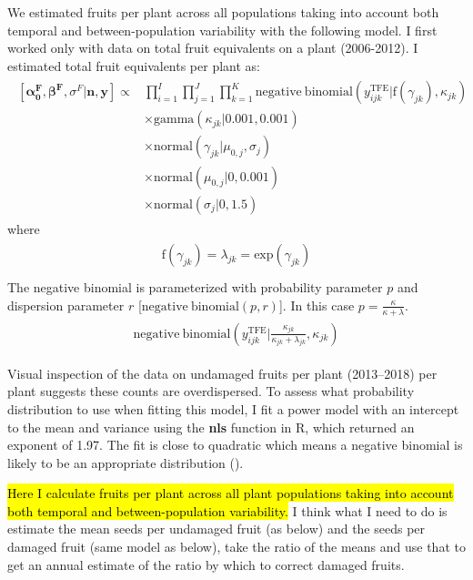 \documentclass[12pt, oneside, titlepage]{article}   	%
\begin{document}
We estimated fruits per plant across all populations taking into account both temporal and between-population variability with the following model. I first worked only with data on total fruit equivalents on a plant (2006-2012). I estimated total fruit equivalents per plant as: 
%
\begin{align}
  \begin{split}
 [ \bm{\alpha^F_0}, \bm{\beta^F}, \sigma^F | \bm{n}, \bm{y} ] \propto 
 & \prod_{i=1}^{I} \prod_{j=1}^{J} \prod_{k=1}^{K}  \mathrm{negative \ binomial} ( y^{\mathrm{TFE}}_{ijk} | \mathrm{f} ( \gamma_{jk} ),  \kappa_{jk} ) 
     \\ & \times \mathrm{gamma} ( \kappa_{jk} | 0.001 , 0.001 ) 
     \\ & \times \mathrm{normal} ( \gamma_{jk} | \mu_{0,j} , \sigma_j) 
    \\ & \times \mathrm{normal} ( \mu_{0,j} | 0, 0.001 ) 
    \\ & \times \mathrm{normal} ( \sigma_j | 0, 1.5 )  
   \end{split}
\end{align}
%
where
%
\begin{align}
  \begin{split}
\mathrm{f} ( \gamma_{jk} ) = \lambda_{jk} = \mathrm{exp}(  \gamma_{jk} ) \\
  \end{split}
\end{align}
%
The negative binomial is parameterized with probability parameter $p$ and dispersion parameter $r$ [$ \mathrm{negative \ binomial}(p,r)$]. In this case $p=\frac{\kappa}{\kappa+\lambda}$.
%
\begin{align}
  \begin{split}
  \mathrm{negative \ binomial} ( y^{\mathrm{TFE}}_{ijk} | \frac{\kappa_{jk}}{\kappa_{jk} + \lambda_{jk}} ,  \kappa_{jk} )
  \end{split}
\end{align}
%

Visual inspection of the data on undamaged fruits per plant (2013--2018) per plant suggests these counts are overdispersed. To assess what probability distribution to use when fitting this model, I fit a power model with an intercept to the mean and variance using the \textbf{nls} function in R, which returned an exponent of 1.97. The fit is close to quadratic which means a negative binomial is likely to be an appropriate distribution (\cite{linden2011}). 

\hl{Here I calculate fruits per plant across all plant populations taking into account both temporal and between-population variability.} I think what I need to do is estimate the mean seeds per undamaged fruit (as below) and the seeds per damaged fruit (same model as below), take the ratio of the means and use that to get an annual estimate of the ratio by which to correct damaged fruits. 
\end{document}

